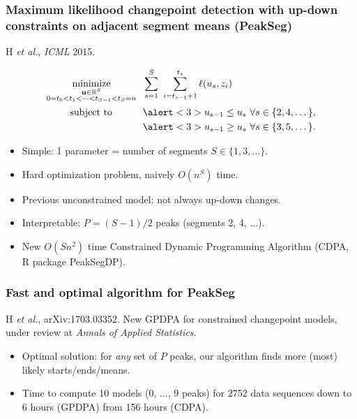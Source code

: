 \documentclass{beamer}
\DeclareMathOperator*{\minimize}{minimize}
\newcommand{\RR}{\mathbb R}
\newcommand{\algo}[1]{\textcolor{#1}{#1}}
\begin{document}
\begin{frame}
  \frametitle{Maximum likelihood changepoint detection with up-down constraints on adjacent segment means (PeakSeg)}
H {\it et al.}, {\it ICML} 2015. 
    
\vskip -1.4cm
\begin{align*}
    \minimize_{\substack{
  \mathbf u\in\RR^{S}
\\
   0=t_0<t_1<\cdots<t_{S-1}<t_S=n
  }} &\ \ 
    \sum_{s=1}^S\  \sum_{i=t_{s-1}+1}^{t_s} \ell( u_s,  z_i) 
  \label{PeakSegPDPA}
\\
      \text{subject to \hskip 0.75cm} &\ \ \alert<3>{u_{s-1} \leq u_s\ \forall s\in\{2,4,\dots\},}
  \nonumber\\
  &\ \ \alert<3>{u_{s-1} \geq u_s\ \forall s\in\{3,5,\dots\}.}
  \nonumber 
\end{align*}
\vskip -0.4cm
\begin{itemize}  
\item Simple: 1 parameter = number of segments $S\in\{1,3,\dots\}$.
\item Hard optimization problem, naively $O(n^S)$ time.
\item \alert<2>{Previous unconstrained model: not always up-down changes.}
\item \alert<3>{Interpretable: $P=(S-1)/2$ peaks (segments 2, 4, ...).}
\item New $O(Sn^2)$ time Constrained Dynamic Programming Algorithm
  (CDPA, R package PeakSegDP).
\end{itemize}
\end{frame} 

\begin{frame}
  \frametitle{Fast and optimal algorithm for PeakSeg}
  H {\it et al.}, arXiv:1703.03352. New GPDPA for 
  constrained changepoint models, under review at {\it Annals of
    Applied Statistics}.
  \begin{itemize}
  \item Optimal solution: for \emph{any} set of $P$ peaks, our
    algorithm finds more (most) likely starts/ends/means.
  \item Time to compute 10 models (0, ..., 9 peaks) for 2752 data
    sequences down to \textcolor{GPDPA}{6 hours (GPDPA)} from
    \textcolor{CDPA}{156 hours (CDPA)}.
  \end{itemize}

  

\end{frame}
\end{document}
